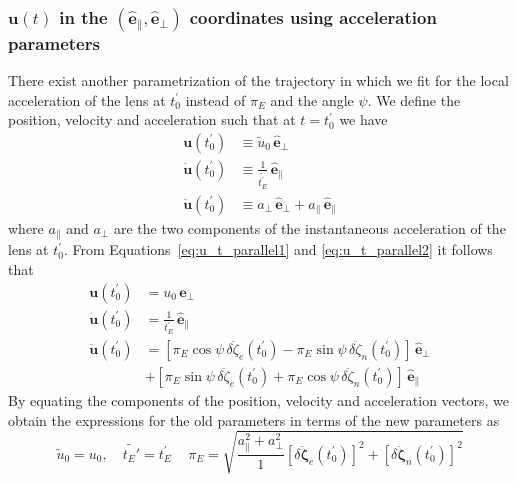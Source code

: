\documentclass[12pt,dvipsnames]{report}
\begin{document}
\subsubsection{$\mathbf{u}(t)$ in the $(\mathbf{\hat e}_\parallel, \mathbf{\hat e}_\bot)$ coordinates using acceleration parameters} There
exist another parametrization of the trajectory in which we fit for the local
acceleration of the lens at $t_0^\prime$ instead of $\pi_E$ and the angle $\psi$. We
define the position, velocity and acceleration such that at $t=t_0^\prime$ we have
\begin{align}
    \mathbf{u}(t_0^\prime)       & \equiv \widetilde{u}_0 \,\hat{\mathbf e}_\bot
    \label{eq:u_primed_def}                                               \\
    \dot{\mathbf{u}}(t_0^\prime) & \equiv \frac{1}{\widetilde{t_E^\prime}}\,
    \hat{\mathbf e}_\parallel \label{eq:u_dot_primed_def}                 \\ \ddot{\mathbf{u}}(t_0^\prime) & \equiv
       a_\bot\,\hat{\mathbf e}_\bot + a_\parallel\,\hat{\mathbf e}_\parallel \label{eq:u_ddot_primed_def}
\end{align}
where $a_\parallel$ and $a_\bot$ are the two components of the instantaneous acceleration of
the lens at $t_0^\prime$. From Equations~\ref{eq:u_t_parallel1} and
\ref{eq:u_t_parallel2} it follows that
\begin{align}
    \mathbf{u}(t_0^\prime)       & = u_0\,\hat{\mathbf e}_\bot                    \\
    \dot{\mathbf{u}}(t_0^\prime) & =\frac{1}{t_E^\prime}\,\hat{\mathbf e}_\parallel     \\ \ddot{\mathbf{u}}(t_0^\prime) &
       =\left[\pi_E\cos\psi\,\delta\ddot{\zeta}_e(t_0^\prime)
    -\pi_E\sin\psi\,\delta\ddot{\zeta}_n(t_0^\prime)\right]\,\hat{\mathbf e}_\bot \\  &
       +\left[\pi_E\sin\psi\,\delta\ddot{\zeta}_e(t_0^\prime)
           +\pi_E\cos\psi\,\delta\ddot{\zeta}_n(t_0^\prime)\right]\,\hat{\mathbf e}_\parallel
\end{align}
By equating the components of the position, velocity and acceleration vectors, we obtain the expressions for the old parameters in terms of the new parameters as
\begin{equation}
    \widetilde{u}_0=u_0,\quad \widetilde{t_E'}=t_E^\prime\,\quad
    \pi_E=\sqrt{\frac{a_\parallel^2 + a_\bot^2}{1} \left[\delta\ddot{\boldsymbol{\zeta}}_e(t_0^\prime)\right]^2 +
        \left[\delta\ddot{\boldsymbol{\zeta}}_n(t_0^\prime)\right]^2}
\end{equation}
\end{document}
